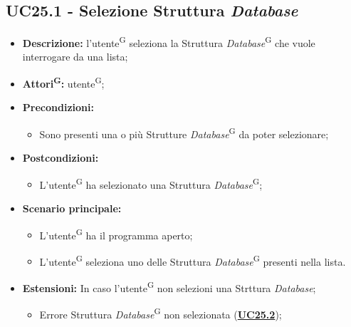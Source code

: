 \subsection{UC25.1 - Selezione Struttura \textit{Database}}
\label{sec:UC25.1}
\begin{itemize}
	\item \textbf{Descrizione:} l’utente\textsuperscript{G} seleziona la Struttura \textit{Database}\textsuperscript{G} che vuole interrogare da una lista;
	\item \textbf{Attori\textsuperscript{G}:} utente\textsuperscript{G};
	\item \textbf{Precondizioni:}
	\begin{itemize}
		\item Sono presenti una o più Strutture \textit{Database}\textsuperscript{G} da poter selezionare;
	\end{itemize}
	\item \textbf{Postcondizioni:}
	\begin{itemize}
		\item L’utente\textsuperscript{G} ha selezionato una Struttura \textit{Database}\textsuperscript{G};
	\end{itemize}
	\item \textbf{Scenario principale:}
	\begin{itemize}
		\item L’utente\textsuperscript{G} ha il programma aperto;
		\item L’utente\textsuperscript{G} seleziona uno delle Struttura \textit{Database}\textsuperscript{G} presenti nella lista.
	\end{itemize}
	\item \textbf{Estensioni:} In caso l'utente\textsuperscript{G} non selezioni una Strttura \textit{Database};
	\begin{itemize}
		\item Errore Struttura \textit{Database}\textsuperscript{G} non selezionata (\hyperref[sec:UC25.2]{\textbf{UC25.2}});
	\end{itemize}
\end{itemize}

